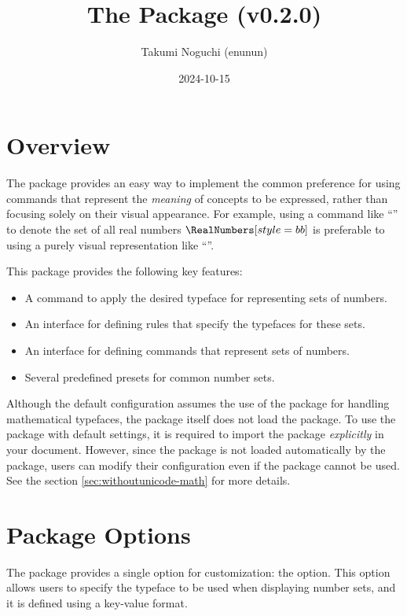 \documentclass{l3doc}
\title{The \ThisPackageName{} Package (v0.2.0)}
\author{Takumi Noguchi (enunun)}
\date{2024-10-15}
\begin{document}
\maketitle

\tableofcontents

\section{Overview}

The \ThisPackageName{} package provides an easy way to implement the common preference for using commands
that represent the \emph{meaning} of concepts to be expressed,
rather than focusing solely on their visual appearance.
For example, using a command like ``'' to denote the set of all real numbers \(\RealNumbers[style=bb]\) is preferable
to using a purely visual representation like ``''.

This package provides the following key features:
\begin{itemize}
	\item A command to apply the desired typeface for representing sets of numbers.
	\item An interface for defining rules that specify the typefaces for these sets.
	\item An interface for defining commands that represent sets of numbers.
	\item Several predefined presets for common number sets.
\end{itemize}

Although the default configuration assumes the use of the  package for handling mathematical typefaces,
the \ThisPackageName{} package itself does not load the  package.
To use the package with default settings,
it is required to import the  package \emph{explicitly} in your document.
However, since the  package is not loaded automatically by the \ThisPackageName{} package,
users can modify their configuration even if the  package cannot be used.
See the section \ref{sec:withoutunicode-math} for more details.


\section{Package Options}
\label{sec:packageoptions}

The \ThisPackageName{} package provides a single option for customization:
the  option.
This option allows users to specify the typeface to be used when displaying number sets,
and it is defined using a key-value format.
\end{document}
